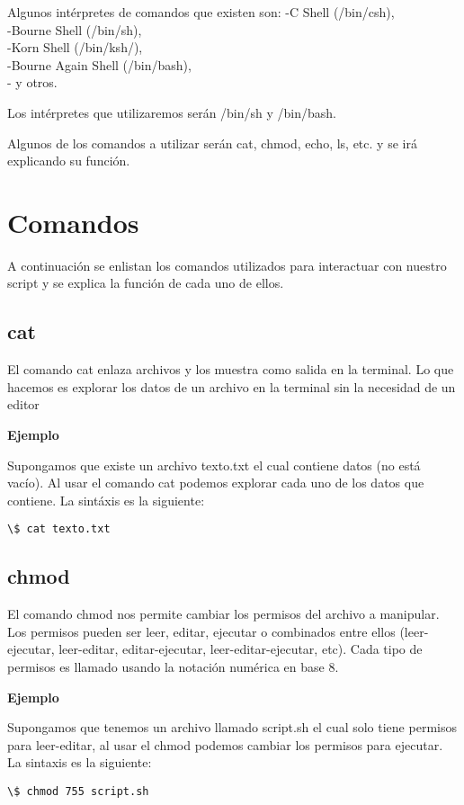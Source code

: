\documentclass[12pt]{article}
\begin{document}
Algunos intérpretes de comandos que existen son:
-C Shell (/bin/csh),\\-Bourne Shell (/bin/sh),\\-Korn Shell (/bin/ksh/),\\-Bourne Again Shell (/bin/bash),\\- y otros.

Los intérpretes que utilizaremos serán /bin/sh y /bin/bash.

Algunos de los comandos a utilizar serán cat, chmod, echo, ls, etc. y se irá explicando su función.

\section{Comandos}

A continuación se enlistan los comandos utilizados para interactuar con nuestro script y se explica la función de cada uno de ellos.

\subsection{cat}

El comando cat enlaza archivos y los muestra como salida en la terminal. Lo que hacemos es explorar los datos de un archivo en la terminal sin la necesidad de un editor

\textbf{Ejemplo}

Supongamos que existe un archivo texto.txt el cual contiene datos (no está vacío). Al usar el comando cat podemos explorar cada uno de los datos que contiene. La sintáxis es la siguiente:

\begin{verbatim}
\$ cat texto.txt
\end{verbatim}

\subsection{chmod}

El comando chmod nos permite cambiar los permisos del archivo a manipular. Los permisos pueden ser leer, editar, ejecutar o combinados entre ellos (leer-ejecutar, leer-editar, editar-ejecutar, leer-editar-ejecutar, etc). Cada tipo de permisos es llamado usando la notación numérica en base 8.

\textbf{Ejemplo}

Supongamos que tenemos un archivo llamado script.sh el cual solo tiene permisos para leer-editar, al usar el chmod podemos cambiar los permisos para ejecutar. La sintaxis es la siguiente:
\begin{verbatim}
\$ chmod 755 script.sh
\end{verbatim}
\end{document}
